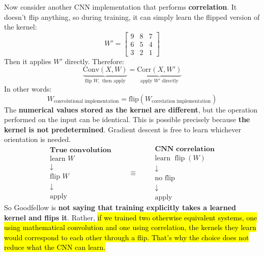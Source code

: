 \begin{itemize}
\begin{deepeningbox}
        \highspace
        Now consider another CNN implementation that performs \textbf{correlation}. It doesn't flip anything, so during training, it can simply learn the flipped version of the kernel:
        \begin{equation*}
            W' = \begin{bmatrix}
                9 & 8 & 7 \\
                6 & 5 & 4 \\
                3 & 2 & 1
            \end{bmatrix}
        \end{equation*}
        Then it applies $W'$ directly. Therefore:
        \begin{equation*}
            \underbrace{\text{Conv}(X, W)}_{\text{flip } W, \text{ then apply}} = \underbrace{\text{Corr}(X, W')}_{\text{apply } W' \text{ directly}}
        \end{equation*}
        In other words:
        \begin{equation*}
            W_{\text{convolutional implementation}} = \text{flip}\left(W_{\text{correlation implementation}}\right)
        \end{equation*}
        The \textbf{numerical values stored as the kernel are different}, but the operation performed on the input can be identical. This is possible precisely because \textbf{the kernel is not predetermined}. Gradient descent is free to learn whichever orientation is needed.
        \begin{equation*}
            \begin{array}{c}
                \textbf{True convolution}\\[2mm]\text{learn }W\\\downarrow\\\text{flip }W\\\downarrow\\\text{apply}
            \end{array}\qquad\equiv\qquad
            \begin{array}{c}
                \textbf{CNN correlation}\\[2mm]\text{learn }\operatorname{flip}(W)\\\downarrow\\\text{no flip}\\\downarrow\\\text{apply}
            \end{array}
        \end{equation*}
        So Goodfellow is \textbf{not saying that training explicitly takes a learned kernel and flips it}. Rather, \hl{if we trained two otherwise equivalent systems, one using mathematical convolution and one using correlation, the kernels they learn would correspond to each other through a flip. That's why the choice does not reduce what the CNN can learn.}
    \end{deepeningbox}
\end{itemize}

